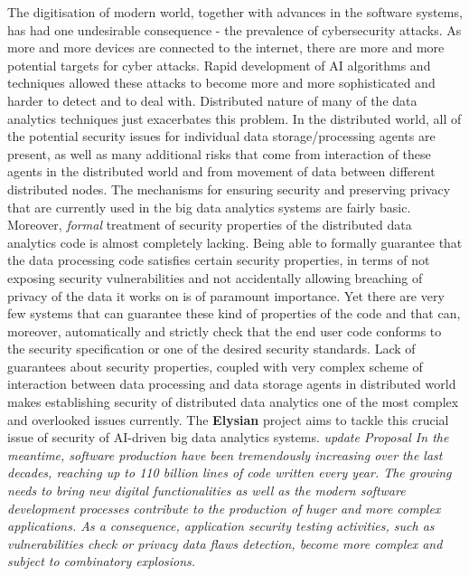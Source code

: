 \documentclass[a4paper,11pt]{article}
\newcommand{\project}[1]{\textbf{#1}\xspace}
\newcommand{\SECURITY}{\project{Elysian}}
\newcommand{\TheProject}{\SECURITY}
\begin{document}
The digitisation of modern world, together with advances in the software systems, has had one undesirable consequence - the prevalence of cybersecurity attacks. As more and more devices are connected to the internet, there are more and more potential targets for cyber attacks. Rapid development of AI algorithms and techniques allowed these attacks to become more and more sophisticated and harder to detect and to deal with. Distributed nature of many of the data analytics techniques just exacerbates this problem. In the distributed world, all of the potential security issues for individual data storage/processing agents are present, as well as many additional risks that come from interaction of these agents in the distributed world and from movement of data between different distributed nodes. The mechanisms for ensuring security and preserving privacy that are currently used in the big data analytics systems are fairly basic. Moreover, \emph{formal} treatment of security properties of the distributed data analytics code is almost completely lacking. Being able to formally guarantee that the data processing code satisfies certain security properties, in terms of not exposing security vulnerabilities and not accidentally allowing breaching of privacy of the data it works on is of paramount importance. Yet there are very few systems that can guarantee these kind of properties of the code and that can, moreover, automatically and strictly check that the end user code conforms to the security specification or one of the desired security standards. Lack of guarantees about security properties, coupled with very complex scheme of interaction between data processing and data storage agents in distributed world makes establishing security of distributed data analytics one of the most complex and overlooked issues currently. The \TheProject{} project aims to tackle this crucial issue of security of AI-driven big data analytics systems.
\textit{
{\color{blue} \YAGshort{} update Proposal} In the meantime, software production have been tremendously increasing over the last decades, reaching up to 110 billion lines of code written every year. The growing needs to bring new digital functionalities as well as the modern software development processes contribute to the production of huger and more complex applications. As a consequence, application security testing activities, such as vulnerabilities check or privacy data flaws detection, become more complex and subject to combinatory explosions.
}
\end{document}
